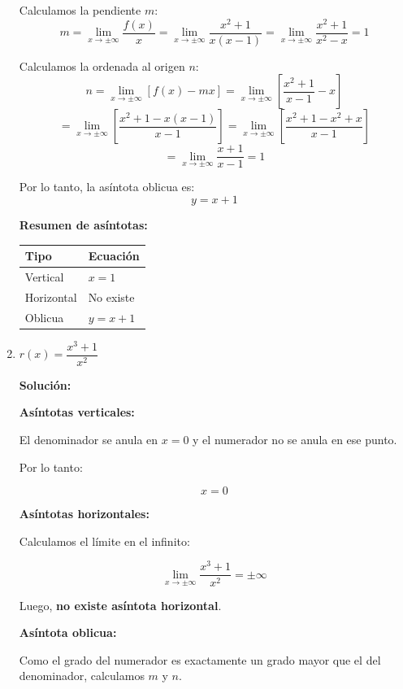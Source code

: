 \documentclass[12pt]{article}
\newcommand{\solucion}{%
    \vspace{0.8em}%
    \textbf{Solución:}%
}
\begin{document}
\begin{enumerate}[label=\alph*)]
    Calculamos la pendiente $m$:
    \[
    m = \lim_{x \to \pm\infty} \frac{f(x)}{x} = \lim_{x \to \pm\infty} \frac{x^2 + 1}{x(x - 1)} = \lim_{x \to \pm\infty} \frac{x^2 + 1}{x^2 - x} = 1
    \]

    Calculamos la ordenada al origen $n$:
    \[
    n = \lim_{x \to \pm\infty} \left[f(x) - mx\right] = \lim_{x \to \pm\infty} \left[\frac{x^2 + 1}{x - 1} - x\right]
    \]
    \[
    = \lim_{x \to \pm\infty} \left[\frac{x^2 + 1 - x(x-1)}{x - 1}\right] = \lim_{x \to \pm\infty} \left[\frac{x^2 + 1 - x^2 + x}{x - 1}\right]
    \]
    \[
    = \lim_{x \to \pm\infty} \frac{x + 1}{x - 1} = 1
    \]

    Por lo tanto, la asíntota oblicua es:
    \[
    \boxed{y = x + 1}
    \]

    \newpage
    \vspace{0.5em}
    \textbf{Resumen de asíntotas:}

    \begin{center}
    \begin{tabular}{ll}
        \toprule
        Tipo & Ecuación \\
        \midrule
        Vertical & $x = 1$ \\
        Horizontal & No existe \\
        Oblicua & $y = x + 1$ \\
        \bottomrule
    \end{tabular}
    \end{center}

    \item $r(x) = \dfrac{x^3 + 1}{x^2}$

    \solucion

    \textbf{Asíntotas verticales:}

    El denominador se anula en $x = 0$ y el numerador no se anula en ese punto.

    Por lo tanto:

    \[
    \boxed{x = 0}
    \]

    \textbf{Asíntotas horizontales:}

    Calculamos el límite en el infinito:

    \[
    \lim_{x \to \pm\infty} \frac{x^3+1}{x^2}
    =
    \pm\infty
    \]

    Luego, \textbf{no existe asíntota horizontal}.

    \textbf{Asíntota oblicua:}

    Como el grado del numerador es exactamente un grado mayor que el del denominador,
    calculamos $m$ y $n$.


\end{enumerate}
\end{document}
